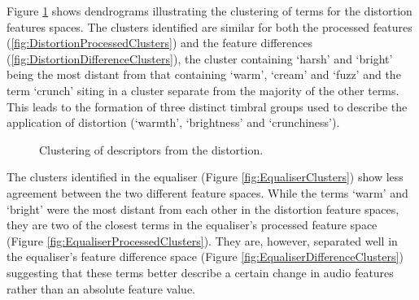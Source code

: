 		Figure \ref{fig:DistortionClusters} shows dendrograms illustrating the clustering of terms for the
		distortion features spaces. The clusters identified are similar for both the processed features
		(\ref{fig:DistortionProcessedClusters}) and the feature differences
		(\ref{fig:DistortionDifferenceClusters}), the cluster containing `harsh' and `bright' being the most distant
		from that containing `warm', `cream' and `fuzz' and the term `crunch' siting in a cluster separate from the
		majority of the other terms. This leads to the formation of three distinct timbral groups used to describe
		the application of distortion (`warmth', `brightness' and `crunchiness'). 

		\begin{figure}[h!]
			\centering
			\qquad
			\caption{Clustering of descriptors from the distortion.}
			\label{fig:DistortionClusters}
		\end{figure}
		
		The clusters identified in the equaliser (Figure \ref{fig:EqualiserClusters}) show less agreement between
		the two different feature spaces. While the terms `warm' and `bright' were the most distant from each other
		in the distortion feature spaces, they are two of the closest terms in the equaliser's processed feature
		space (Figure \ref{fig:EqualiserProcessedClusters}). They are, however, separated well in the equaliser's
		feature difference space (Figure \ref{fig:EqualiserDifferenceClusters}) suggesting that these terms better
		describe a certain change in audio features rather than an absolute feature value.

